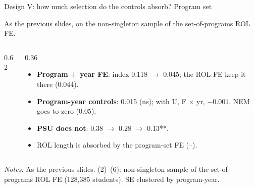 \documentclass{beamer}
\begin{document}
\begin{frame}[label=d5-balance-noctrl-set]{Design V: how much selection do the controls absorb? Program set}
\vspace{-0.2cm}
{\scriptsize As the previous slides, on the non-singleton sample of the set-of-programs ROL FE.\par}
\vspace{0.05cm}
\begin{columns}[T,onlytextwidth]
\begin{column}{0.62\textwidth}
\centering
\resizebox{\linewidth}{!}{}
\end{column}
\begin{column}{0.36\textwidth}
\scriptsize
\begin{itemize}
    \setlength{\itemsep}{2pt}
    \item \textbf{Program + year FE}: index 0.118 $\to$ 0.045; the ROL FE keep it there (0.044).
    \item \textbf{Program-year controls}: 0.015 (ns); with U, F $\times$ yr, $-0.001$. NEM goes to zero (0.05).
    \item \textbf{PSU does not}: 0.38 $\to$ 0.28 $\to$ 0.13**.
    \item ROL length is absorbed by the program-set FE (--).
\end{itemize}
\end{column}
\end{columns}

\vspace{0.05cm}
\parbox{0.97\textwidth}{\tiny \textit{Notes:} As the previous slides. (2)--(6): non-singleton sample of the set-of-programs ROL FE (128,385 students). SE clustered by program-year.}
\end{frame}
\end{document}
